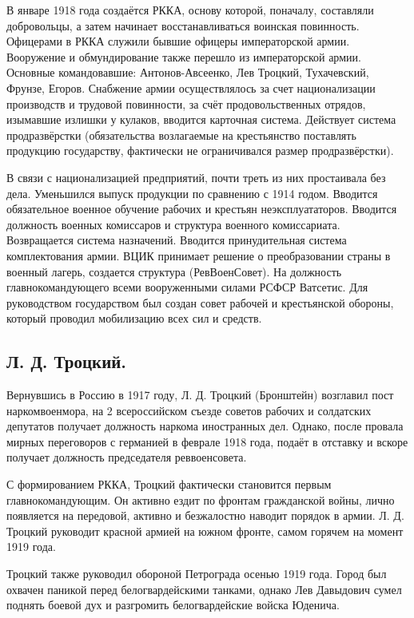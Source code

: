 В январе 1918 года создаётся РККА, основу которой, поначалу, составляли добровольцы, а затем начинает восстанавливаться воинская повинность. Офицерами в РККА служили бывшие офицеры императорской армии. Вооружение и обмундирование также перешло из императорской армии. 
Основные командовавшие: Антонов-Авсеенко, Лев Троцкий, Тухачевский, Фрунзе, Егоров.
Снабжение армии осуществлялось за счет национализации производств и трудовой повинности, за счёт продовольственных отрядов, изымавшие излишки у кулаков, вводится карточная система. Действует система продразвёрстки (обязательства возлагаемые на крестьянство поставлять продукцию государству, фактически не ограничивался размер продразвёрстки).

В связи с национализацией предприятий, почти треть из них простаивала без дела. Уменьшился выпуск продукции по сравнению с 1914 годом.
Вводится обязательное военное обучение рабочих и крестьян неэксплуататоров. Вводится должность военных комиссаров и структура военного комиссариата. Возвращается система назначений. Вводится принудительная система комплектования армии.
ВЦИК принимает решение о преобразовании страны в военный лагерь, создается структура (РевВоенСовет). На должность главнокомандующего всеми вооруженными силами РСФСР Ватсетис. Для руководством государством был создан совет рабочей и крестьянской обороны, который проводил мобилизацию всех сил и средств.

\subsection{Л. Д. Троцкий.}

Вернувшись в Россию в 1917 году, Л. Д. Троцкий (Бронштейн) возглавил пост наркомвоенмора, на 2 всероссийском съезде советов рабочих и солдатских депутатов получает должность наркома иностранных дел. Однако, после провала  мирных переговоров с германией в феврале 1918 года, подаёт в отставку и вскоре получает должность председателя реввоенсовета. 

С формированием РККА, Троцкий фактически становится первым главнокомандующим. Он активно ездит по фронтам гражданской войны, лично появляется на передовой, активно и безжалостно наводит порядок в армии. Л. Д. Троцкий руководит красной армией на южном фронте, самом горячем на момент 1919 года.

Троцкий также руководил обороной Петрограда осенью 1919 года. Город был охвачен паникой перед белогвардейскими танками, однако Лев Давыдович сумел поднять боевой дух и разгромить белогвардейские войска Юденича.

